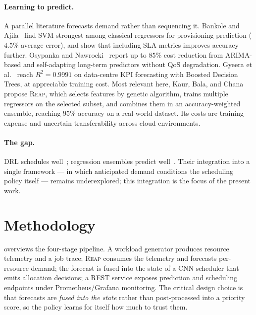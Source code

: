 \documentclass{svproc}
\newcommand{\reap}{\textsc{Reap}}
\begin{document}
\paragraph{Learning to predict.} A parallel literature forecasts demand
rather than sequencing it. Bankole and Ajila~\cite{bankole2013} find
SVM strongest among classical regressors for provisioning prediction
($4.5\%$ average error), and show that including SLA metrics improves
accuracy further. Osypanka and Nawrocki~\cite{osypanka2022,osypanka2023}
report up to $85\%$ cost reduction from ARIMA-based and self-adapting
long-term predictors without QoS degradation. Gyeera
et al.~\cite{gyeera2023} reach $R^2=0.9991$ on data-centre KPI
forecasting with Boosted Decision Trees, at appreciable training cost.
Most relevant here, Kaur, Bala, and Chana~\cite{kaur2019} propose
\reap{}, which selects features by genetic algorithm, trains multiple
regressors on the selected subset, and combines them in an
accuracy-weighted ensemble, reaching $95\%$ accuracy on a real-world
dataset. Its costs are training expense and uncertain transferability
across cloud environments.

\begin{sloppypar}
\paragraph{The gap.} DRL schedules
well~\cite{guo2021,mao2016,savitha2021,son2019,zhou2021}; regression
ensembles predict
well~\cite{bankole2013,gyeera2023,kaur2019,osypanka2022,osypanka2023}.
Their integration into a single framework --- in which anticipated
demand conditions the scheduling policy itself --- remains
underexplored; this integration is the focus of the present work.
\end{sloppypar}

\section{Methodology}\label{sec:methodology}
 overviews the four-stage pipeline. A workload
generator produces resource telemetry and a job trace; \reap{} consumes
the telemetry and forecasts per-resource demand; the forecast is fused
into the state of a CNN scheduler that emits allocation decisions; a
REST service exposes prediction and scheduling endpoints under
Prometheus/Grafana monitoring. The critical design choice is that
forecasts are \emph{fused into the state} rather than post-processed
into a priority score, so the policy learns for itself how much to
trust them.
\end{document}
